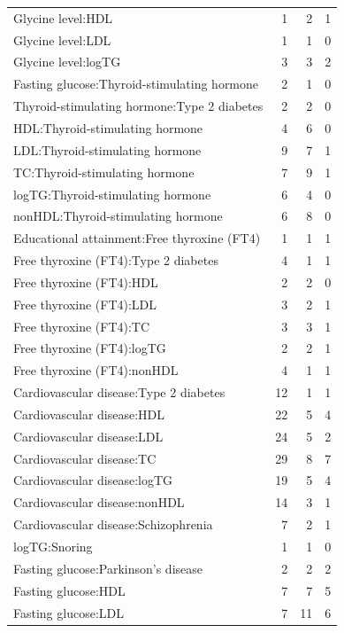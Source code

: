 \begin{table}[ht]
\begin{tabular}{lrrr}
  Glycine level:HDL &   1 &   2 &   1 \\ 
  Glycine level:LDL &   1 &   1 &   0 \\ 
  Glycine level:logTG &   3 &   3 &   2 \\ 
  Fasting glucose:Thyroid-stimulating hormone &   2 &   1 &   0 \\ 
  Thyroid-stimulating hormone:Type 2 diabetes &   2 &   2 &   0 \\ 
  HDL:Thyroid-stimulating hormone &   4 &   6 &   0 \\ 
  LDL:Thyroid-stimulating hormone &   9 &   7 &   1 \\ 
  TC:Thyroid-stimulating hormone &   7 &   9 &   1 \\ 
  logTG:Thyroid-stimulating hormone &   6 &   4 &   0 \\ 
  nonHDL:Thyroid-stimulating hormone &   6 &   8 &   0 \\ 
  Educational attainment:Free thyroxine (FT4) &   1 &   1 &   1 \\ 
  Free thyroxine (FT4):Type 2 diabetes &   4 &   1 &   1 \\ 
  Free thyroxine (FT4):HDL &   2 &   2 &   0 \\ 
  Free thyroxine (FT4):LDL &   3 &   2 &   1 \\ 
  Free thyroxine (FT4):TC &   3 &   3 &   1 \\ 
  Free thyroxine (FT4):logTG &   2 &   2 &   1 \\ 
  Free thyroxine (FT4):nonHDL &   4 &   1 &   1 \\ 
  Cardiovascular disease:Type 2 diabetes &  12 &   1 &   1 \\ 
  Cardiovascular disease:HDL &  22 &   5 &   4 \\ 
  Cardiovascular disease:LDL &  24 &   5 &   2 \\ 
  Cardiovascular disease:TC &  29 &   8 &   7 \\ 
  Cardiovascular disease:logTG &  19 &   5 &   4 \\ 
  Cardiovascular disease:nonHDL &  14 &   3 &   1 \\ 
  Cardiovascular disease:Schizophrenia &   7 &   2 &   1 \\ 
  logTG:Snoring &   1 &   1 &   0 \\ 
  Fasting glucose:Parkinson's disease &   2 &   2 &   2 \\ 
  Fasting glucose:HDL &   7 &   7 &   5 \\ 
  Fasting glucose:LDL &   7 &  11 &   6 \\ 

\end{tabular}
\end{table}
